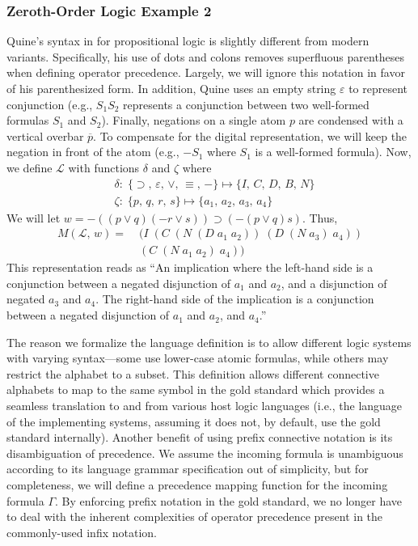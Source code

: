 \documentclass[ms]{uncgdissertationexp2}
\theoremstyle{plain}
\theoremstyle{definition}
\theoremstyle{remark}
\begin{document}
\subsubsection{Zeroth-Order Logic Example 2}
Quine's syntax in \cite{methodsoflogic} for propositional logic is slightly different from modern variants. Specifically, his use of dots and colons removes superfluous parentheses when defining operator precedence. Largely, we will ignore this notation in favor of his parenthesized form. In addition, Quine uses an empty string $\varepsilon$ to represent conjunction (e.g., $S_{1}S_{2}$ represents a conjunction between two well-formed formulas $S_{1}$ and $S_{2}$). Finally, negations on a single atom $p$ are condensed with a vertical overbar $\overline{p}$. To compensate for the digital representation, we will keep the negation in front of the atom (e.g., $-S_1$ where $S_1$ is a well-formed formula). Now, we define $\mathcal{L}$ with functions $\delta$ and $\zeta$ where
\begin{align*}
	& \delta:\;\{\supset,\,\varepsilon,\,\lor,\,\equiv,\,-\}\mapsto \{I,\,C,\,D,\,B,\,N\} \\
	& \zeta:\;\{p,\,q,\,r,\,s\} \mapsto \{a_{1},\,a_{2},\,a_{3},\,a_{4}\}  
\end{align*}
We will let $w = -((p\lor q)(-r\lor s)) \supset (-(p\lor q)s)$. Thus,
\begin{align*}
	M(\mathcal{L},\,w) =\;&(I\;(C\;(N\;(D\;a_1\;a_2))\;(D\;(N\;a_3)\;a_4))\\
					   	 &(C\;(N\;a_1\;a_2)\;a_4))
\end{align*}
This representation reads as ``An implication where the left-hand side is a conjunction between a negated disjunction of $a_1$ and $a_2$, and a disjunction of negated $a_3$ and $a_4$. The right-hand side of the implication is a conjunction between a negated disjunction of $a_1$ and $a_2$, and $a_4$.''

The reason we formalize the language definition is to allow different logic systems with varying syntax---some use lower-case atomic formulas, while others may restrict the alphabet to a subset. This definition allows different connective alphabets to map to the same symbol in the gold standard which provides a seamless translation to and from various host logic languages (i.e., the language of the implementing systems, assuming it does not, by default, use the gold standard internally). Another benefit of using prefix connective notation is its disambiguation of precedence. We assume the incoming formula is unambiguous according to its language grammar specification out of simplicity, but for completeness, we will define a precedence mapping function for the incoming formula $\Gamma$. By enforcing prefix notation in the gold standard, we no longer have to deal with the inherent complexities of operator precedence present in the commonly-used infix notation.
\end{document}
